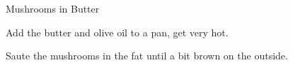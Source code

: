 \documentclass{recipe}
\begin{document}
\begin{recipe}{Mushrooms in Butter}
  \label{mushrooms_butter}
  \begin{ingredients}
  \end{ingredients}

  \begin{steps}
    \item Add the butter and olive oil to a pan, get very hot.
    \item Saute the mushrooms in the fat until a bit brown on the
      outside.
  \end{steps}
\end{recipe}
\end{document}
